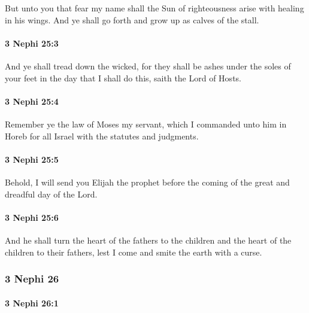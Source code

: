 			But unto you that fear my name
			shall the Sun of righteousness arise with healing in his wings.
			And ye shall go forth and grow up as calves of the stall.

		\paragraph{3 Nephi 25:3} %
			\label{3NEPHI-25-3}

			And ye shall tread down the wicked,
			for they shall be ashes under the soles of your feet
			in the day that I shall do this, saith the Lord of Hosts.

		\paragraph{3 Nephi 25:4} %
			\label{3NEPHI-25-4}

			Remember ye the law of Moses my servant,
			which I commanded unto him in Horeb for all Israel
			with the statutes and judgments.

		\paragraph{3 Nephi 25:5} %
			\label{3NEPHI-25-5}

			Behold, I will send you Elijah the prophet
			before the coming of the great and dreadful day of the Lord.

		\paragraph{3 Nephi 25:6} %
			\label{3NEPHI-25-6}

			And he shall turn the heart of the fathers to the children
			and the heart of the children to their fathers,
			lest I come and smite the earth with a curse.

	\subsubsection{3 Nephi 26} %
		\label{3NEPHI-26}
		
		\paragraph{3 Nephi 26:1} %
			\label{3NEPHI-26-1}

